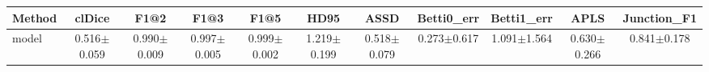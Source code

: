 \begin{tabular}{lcccccccccc}
\toprule
Method & clDice & F1@2 & F1@3 & F1@5 & HD95 & ASSD & Betti0_err & Betti1_err & APLS & Junction_F1 \\
\midrule
model & 0.516$\pm$0.059 & 0.990$\pm$0.009 & 0.997$\pm$0.005 & 0.999$\pm$0.002 & 1.219$\pm$0.199 & 0.518$\pm$0.079 & 0.273$\pm$0.617 & 1.091$\pm$1.564 & 0.630$\pm$0.266 & 0.841$\pm$0.178 \\
\bottomrule
\end{tabular}